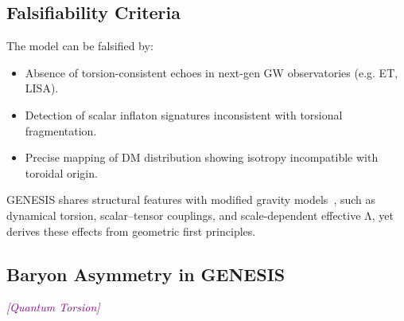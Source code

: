 \documentclass{article}
\newcommand{\quantumtag}{\textcolor{purple}{\textit{[Quantum Torsion]}}}
\begin{document}
\medskip
\begin{center}
\end{center}
\medskip


\subsection{Falsifiability Criteria} The model can be falsified by: \begin{itemize} \item Absence of torsion-consistent echoes in next-gen GW observatories (e.g. ET, LISA). \item Detection of scalar inflaton signatures inconsistent with torsional fragmentation. \item Precise mapping of DM distribution showing isotropy incompatible with toroidal origin. \end{itemize}

\medskip
\begin{center}
\end{center}
\medskip

GENESIS shares structural features with modified gravity models~\cite{nojiri2017,saridakis2021}, such as dynamical torsion, scalar–tensor couplings, and scale-dependent effective Λ, yet derives these effects from geometric first principles.


\subsection{Baryon Asymmetry in GENESIS}
\label{subsec:baryon_asymmetry}
\quantumtag
\end{document}
